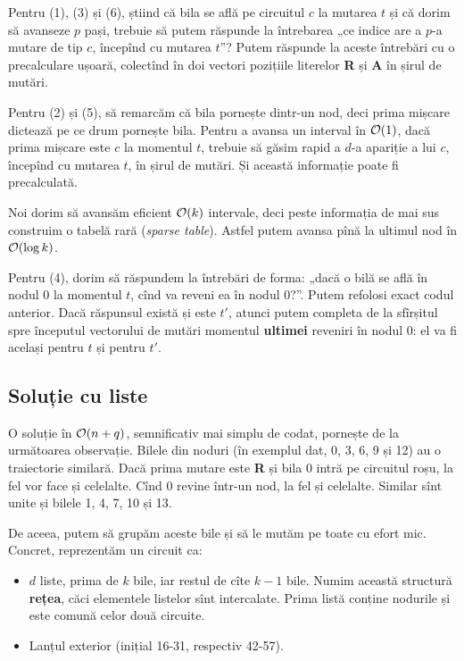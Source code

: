 \documentclass[../main.tex]{subfiles}
\begin{document}
Pentru (1), (3) și (6), știind că bila se află pe circuitul $c$ la mutarea $t$ și că dorim să avanseze $p$ pași, trebuie să putem răspunde la întrebarea „ce indice are a $p$-a mutare de tip $c$, începînd cu mutarea $t$”? Putem răspunde la aceste întrebări cu o precalculare ușoară, colectînd în doi vectori pozițiile literelor \textbf{R} și \textbf{A} în șirul de mutări.

Pentru (2) și (5), să remarcăm că bila pornește dintr-un nod, deci prima mișcare dictează pe ce drum pornește bila. Pentru a avansa un interval în $\mathcal{O}(1)$, dacă prima mișcare este $c$ la momentul $t$, trebuie să găsim rapid a $d$-a apariție a lui $c$, începînd cu mutarea $t$, în șirul de mutări. Și această informație poate fi precalculată.

Noi dorim să avansăm eficient $\mathcal{O}(k)$ intervale, deci peste informația de mai sus construim o tabelă rară (\textit{sparse table}). Astfel putem avansa pînă la ultimul nod în $\mathcal{O}(\log k)$.

Pentru (4), dorim să răspundem la întrebări de forma: „dacă o bilă se află în nodul 0 la momentul $t$, cînd va reveni ea în nodul 0?”. Putem refolosi exact codul anterior. Dacă răspunsul există și este $t'$, atunci putem completa de la sfîrșitul spre începutul vectorului de mutări momentul \textbf{ultimei} reveniri în nodul 0: el va fi același pentru $t$ și pentru $t'$.

\subsection{Soluție cu liste}

O soluție în $\mathcal{O}(n + q)$, semnificativ mai simplu de codat, pornește de la următoarea observație. Bilele din noduri (în exemplul dat, 0, 3, 6, 9 și 12) au o traiectorie similară. Dacă prima mutare este \textbf{R} și bila 0 intră pe circuitul roșu, la fel vor face și celelalte. Cînd 0 revine într-un nod, la fel și celelalte. Similar sînt unite și bilele 1, 4, 7, 10 și 13.

De aceea, putem să grupăm aceste bile și să le mutăm pe toate cu efort mic. Concret, reprezentăm un circuit ca:

\begin{itemize}
  \item $d$ liste, prima de $k$ bile, iar restul de cîte $k-1$ bile. Numim această structură \textbf{rețea}, căci elementele listelor sînt intercalate. Prima listă conține nodurile și este comună celor două circuite.
  \item Lanțul exterior (inițial 16-31, respectiv 42-57).
\end{itemize}
\end{document}
